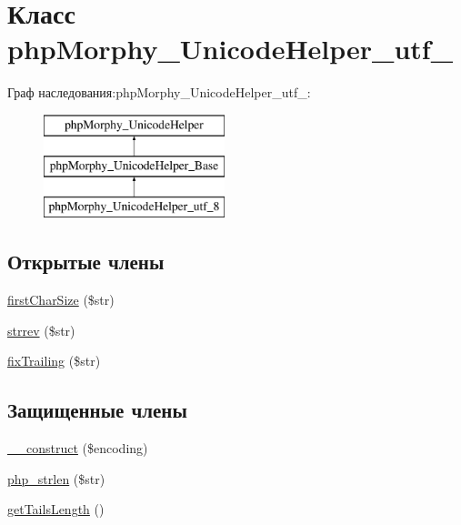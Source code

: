 \hypertarget{classphpMorphy__UnicodeHelper__utf__8}{
\section{Класс phpMorphy\_\-UnicodeHelper\_\-utf\_}
\label{classphpMorphy__UnicodeHelper__utf__8}
}
Граф наследования:phpMorphy\_\-UnicodeHelper\_\-utf\_:\begin{figure}[H]
\begin{center}
\leavevmode
\includegraphics[height=3.000000cm]{classphpMorphy__UnicodeHelper__utf__8}
\end{center}
\end{figure}
\subsection*{Открытые члены}
\begin{DoxyCompactItemize}
\item 
\hyperlink{classphpMorphy__UnicodeHelper__utf__8_a2028748f79c9b3f1d74a577bd2cc0dba}{firstCharSize} (\$str)
\item 
\hyperlink{classphpMorphy__UnicodeHelper__utf__8_a8212e8178dbb13c8a3ce05fbaab94bb8}{strrev} (\$str)
\item 
\hyperlink{classphpMorphy__UnicodeHelper__utf__8_a7cddcf292f6804a936b25bf5e20b2913}{fixTrailing} (\$str)
\end{DoxyCompactItemize}
\subsection*{Защищенные члены}
\begin{DoxyCompactItemize}
\item 
\hyperlink{classphpMorphy__UnicodeHelper__utf__8_a7bc19cf2ab74544496b784fa6a104eb2}{\_\-\_\-construct} (\$encoding)
\item 
\hyperlink{classphpMorphy__UnicodeHelper__utf__8_ac835d9e9f47683ac67d1d981dd1479c2}{php\_\-strlen} (\$str)
\item 
\hyperlink{classphpMorphy__UnicodeHelper__utf__8_a0f12334f40b0d91006993e2d6fc71a48}{getTailsLength} ()
\end{DoxyCompactItemize}

